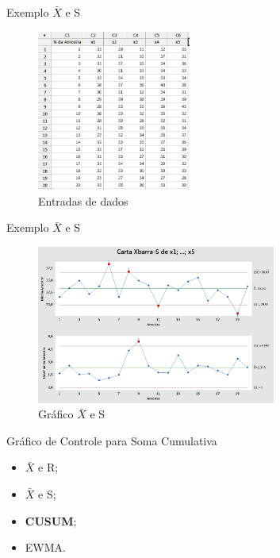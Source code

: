 \documentclass[12pt]{beamer}
\begin{document}
  \begin{frame}[t]{Exemplo $\bar X$ e S}
    \begin{figure}[ht]
      \includegraphics[width=0.45\textwidth]{img/Tabela}
      \caption{Entradas de dados}
    \end{figure}
  \end{frame}

  \begin{frame}[t]{Exemplo $\bar X$ e S}
    \begin{figure}[ht]
      \includegraphics[width=0.7\textwidth]{img/TesteS}
      \caption{Gráfico $\bar X$ e S}
    \end{figure}
  \end{frame}


  \begin{frame}[t]{Gráfico de Controle para Soma Cumulativa}
    \begin{itemize}
      \item $\bar X$ e R;

      \item $\bar X$ e S;

      \item \textbf{CUSUM};

      \item EWMA.
    \end{itemize}
  \end{frame}
\end{document}
